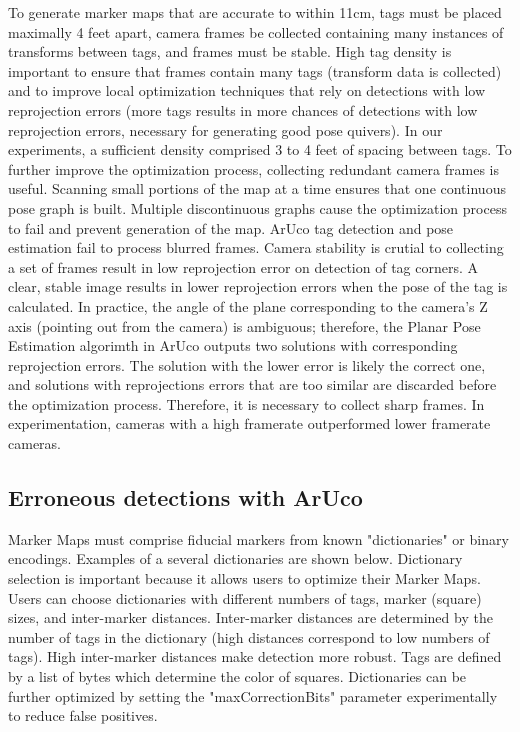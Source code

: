 \documentclass{article}
\begin{document}
    To generate marker maps that are accurate to within 11cm, tags must be placed maximally 4 feet apart, camera frames be collected containing many instances of transforms between tags, and frames must be stable. High tag density is important to ensure that frames contain many tags (transform data is collected) and to improve local optimization techniques that rely on detections with low reprojection errors (more tags results in more chances of detections with low reprojection errors, necessary for generating good pose quivers)\cite{munoz-salinas_rafael_mapping_2016}. In our experiments, a sufficient density comprised 3 to 4 feet of spacing between tags. To further improve the optimization process, collecting redundant camera frames is useful. Scanning small portions of the map at a time ensures that one continuous pose graph is built. Multiple discontinuous graphs cause the optimization process to fail and prevent generation of the map. ArUco tag detection and pose estimation fail to process blurred frames. Camera stability is crutial to collecting a set of frames result in low reprojection error on detection of tag corners. A clear, stable image results in lower reprojection errors when the pose of the tag is calculated. In practice, the angle of the plane corresponding to the camera's Z axis (pointing out from the camera) is ambiguous; therefore, the Planar Pose Estimation algorimth in ArUco outputs two solutions with corresponding reprojection errors. The solution with the lower error is likely the correct one, and solutions with reprojections errors that are too similar are discarded before the optimization process\cite{munoz-salinas_rafael_mapping_2016}. Therefore, it is necessary to collect sharp frames. In experimentation, cameras with a high framerate outperformed lower framerate cameras.

	\subsection{Erroneous detections with ArUco}

    Marker Maps must comprise fiducial markers from known "dictionaries" or binary encodings. Examples of a several dictionaries are shown below. Dictionary selection is important because it allows users to optimize their Marker Maps. Users can choose dictionaries with different numbers of tags, marker (square) sizes, and inter-marker distances. Inter-marker distances are determined by the number of tags in the dictionary (high distances correspond to low numbers of tags). High inter-marker distances make detection more robust. Tags are defined by a list of bytes which determine the color of squares. Dictionaries can be further optimized by setting the "maxCorrectionBits" parameter experimentally to reduce false positives\cite{open_source_computer_vision_detection_2015}.
\end{document}

